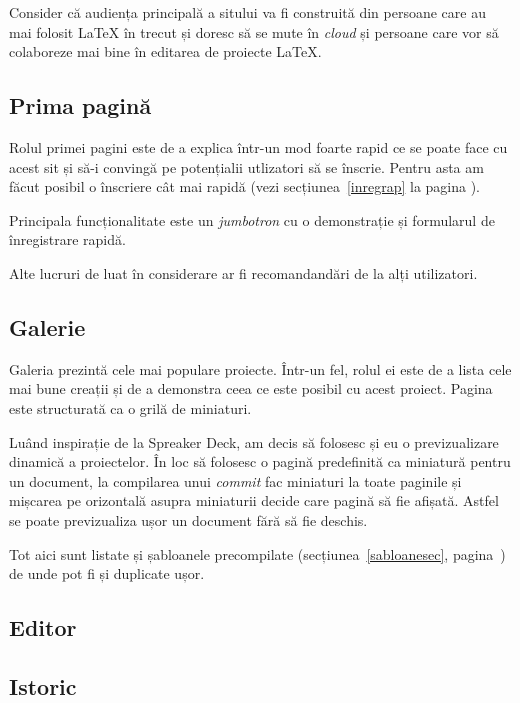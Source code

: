 \documentclass[a4wide,12pt]{report}
\newcommand{\eng}[1]{\emph{#1}} %
\begin{document}
Consider că audiența principală a sitului va fi construită din persoane care au
mai folosit \LaTeX{} în trecut și doresc să se mute în \eng{cloud} și persoane
care vor să colaboreze mai bine în editarea de proiecte \LaTeX{}.

\subsection{Prima pagină}

Rolul primei pagini este de a explica într-un mod foarte rapid ce se poate face
cu acest sit și să-i convingă pe potențialii utlizatori să se înscrie. Pentru
asta am făcut posibil o înscriere cât mai rapidă (vezi secțiunea~\ref{inregrap}
la pagina \pageref{inregrap}).

Principala funcționalitate este un \eng{jumbotron} cu o demonstrație și
formularul de înregistrare rapidă.

Alte lucruri de luat în considerare ar fi recomandandări de la alți utilizatori.

\subsection{Galerie}

Galeria prezintă cele mai populare proiecte. Într-un fel, rolul ei este de a
lista cele mai bune creații și de a demonstra ceea ce este posibil cu acest
proiect. Pagina este structurată ca o grilă de miniaturi.

Luând inspirație de la Spreaker Deck, am decis să folosesc și eu o
previzualizare dinamică a proiectelor. În loc să folosesc o pagină predefinită
ca miniatură pentru un document, la compilarea unui \eng{commit} fac miniaturi
la toate paginile și mișcarea pe orizontală asupra miniaturii decide care pagină
să fie afișată. Astfel se poate previzualiza ușor un document fără să fie
deschis.

Tot aici sunt listate și șabloanele precompilate (secțiunea~\ref{sabloanesec},
pagina~\pageref{sabloanesec}) de unde pot fi și duplicate ușor.

\subsection{Editor}

\subsection{Istoric}
\end{document}
